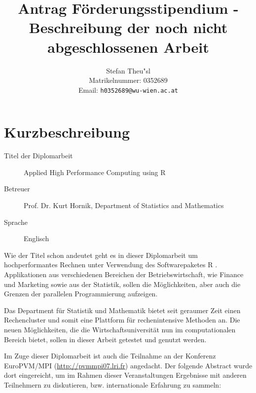 \documentclass[a4paper,fleqn]{article}
\def\email#1{{\tt#1}}
\begin{document}
\title{Antrag F\"orderungsstipendium - Beschreibung der noch nicht
  abgeschlossenen Arbeit}

\author{Stefan Theu"sl \\ Matrikelnummer: 0352689 \\ Email: \email{h0352689@wu-wien.ac.at}}

\maketitle              %

\section{Kurzbeschreibung}

\begin{description}
\item[Titel der Diplomarbeit] Applied High Performance Computing using
  R
\item[Betreuer] Prof. Dr. Kurt Hornik, Department of Statistics and
  Mathematics
\item[Sprache] Englisch

\end{description}

Wie der Titel schon andeutet geht es in dieser Diplomarbeit um
hochperformantes Rechnen unter Verwendung des Softwarepaketes
R \cite{Rcore}. Applikationen aus verschiedenen Bereichen der
Betriebswirtschaft, wie Finance und Marketing sowie aus der Statistik,
sollen die M\"oglichkeiten, aber auch die Grenzen der parallelen
Programmierung aufzeigen.

Das Department f\"ur Statistik und
Mathematik bietet seit geraumer Zeit einen Rechencluster und somit
eine Plattform f\"ur rechenintensive Methoden an. Die neuen
M\"oglichkeiten, die die Wirtschaftsuniversit\"at nun im
computationalen Bereich bietet, sollen in dieser Arbeit getestet und
genutzt werden.

Im Zuge dieser
Diplomarbeit ist auch die Teilnahme an der Konferenz EuroPVM/MPI
(\url{http://pvmmpi07.lri.fr}) angedacht. Der folgende Abstract wurde
dort eingereicht, um im Rahmen dieser Veranstaltungen
Ergebnisse mit anderen Teilnehmern zu diskutieren, bzw. internationale
Erfahrung zu sammeln: 
\end{document}
